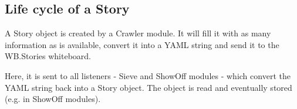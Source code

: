 \subsection{Life cycle of a Story}

A Story object is created by a Crawler module. It will fill it with as many
information as is available, convert it into a \ac{YAML} string and send it to
the WB.Stories whiteboard.

Here, it is sent to all listeners - Sieve and ShowOff modules - which convert
the YAML string back into a Story object. The object is read and eventually
stored (e.g. in ShowOff modules).
